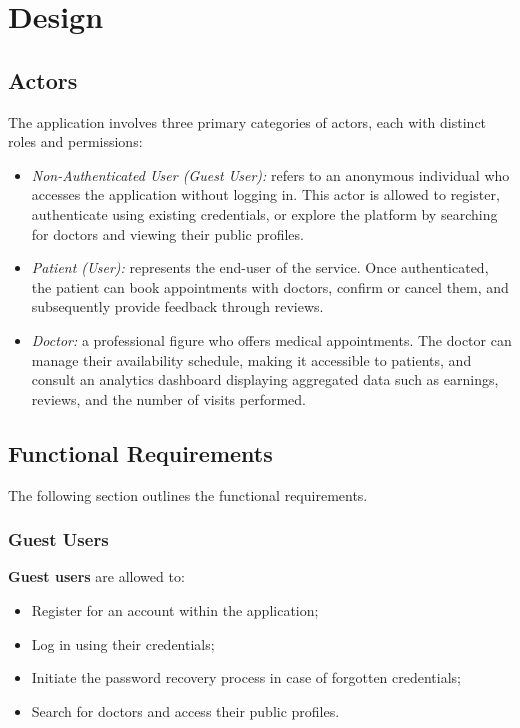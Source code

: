 
\chapter{Design}
\section{Actors}
The application involves three primary categories of actors, each with distinct roles and permissions:
\begin{itemize}
	\item \textit{Non-Authenticated User (Guest User):} refers to an anonymous individual who accesses the application without logging in. This actor is allowed to register, authenticate using existing credentials, or explore the platform by searching for doctors and viewing their public profiles.
	
	\item \textit{Patient (User):} represents the end-user of the service. Once authenticated, the patient can book appointments with doctors, confirm or cancel them, and subsequently provide feedback through reviews.
	
	\item \textit{Doctor:} a professional figure who offers medical appointments. The doctor can manage their availability schedule, making it accessible to patients, and consult an analytics dashboard displaying aggregated data such as earnings, reviews, and the number of visits performed.
\end{itemize}

\section{Functional Requirements}
The following section outlines the functional requirements.

\subsection{Guest Users}
\textbf{Guest users} are allowed to:
\begin{itemize}
	\item Register for an account within the application;
	\item Log in using their credentials;
	\item Initiate the password recovery process in case of forgotten credentials;
	\item Search for doctors and access their public profiles.
\end{itemize}

